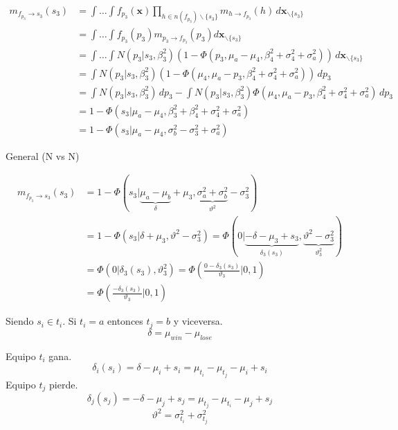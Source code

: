 \documentclass[11pt,twoside,spanish]{report} %
\begin{document}
\begin{equation}
	\begin{split}
		m_{f_{p_3} \rightarrow s_3}(s_3) & = \int \dots \int f_{p_3}(\textbf{x}) \prod_{h \in n(f_{p_3}) \backslash \{s_3\} } m_{h \rightarrow f_{p_3}}(h) \, d\textbf{x}_{\backslash \{s_3\} }  \\
		&= \int \dots \int f_{p_3}(p_3)m_{p_3 \rightarrow f_{p_3}}(p_3) d\textbf{x}_{\backslash \{s_3\} }  \\
		&= \int \dots \int N(p_3| s_3, \beta_3^2) (1 - \Phi(p_3, \mu_a  - \mu_4, \beta_4^2 + \sigma_4^2 + \sigma_a^2)) \, d\textbf{x}_{\backslash \{s_3\} }\\
		& = \int N(p_3| s_3, \beta_3^2) (1 - \Phi(\mu_4, \mu_a  - p_3, \beta_4^2 + \sigma_4^2 + \sigma_a^2)) \, dp_3 \\
		&=\int N(p_3| s_3, \beta_3^2) \, dp_3 -  \int N(p_3| s_3, \beta_3^2)  \Phi(\mu_4, \mu_a  - p_3, \beta_4^2 + \sigma_4^2 + \sigma_a^2) \, dp_3 \\
		&=1 - \Phi\left(s_3| \mu_a-  \mu_4, \beta_3^2 +\beta_4^2 + \sigma_4^2 + \sigma_a^2 \right)\\
		&=1 - \Phi\left(s_3| \mu_a-  \mu_4, \sigma_b^2-\sigma_3^2 + \sigma_a^2 \right)
	\end{split}
\end{equation}

General (N vs N)

\begin{equation}
	\begin{split}
		m_{f_{p_3} \rightarrow s_3}(s_3) & = 1 - \Phi(s_3| \underbrace{\mu_a-\mu_b}_{\delta}+\mu_3, \underbrace{\sigma_a^2 + \sigma_b^2}_{\vartheta^2} - \sigma_3^2 ) \\
		& = 1 - \Phi(s_3| \delta+\mu_3, \vartheta^2- \sigma_3^2 ) = \Phi(0| \underbrace{-\delta-\mu_3+s_3}_{\delta_3(s_3)}, \underbrace{\vartheta^2- \sigma_3^2}_{\vartheta_3^2}) \\
		& = \Phi(0|\delta_3(s_3),\vartheta_3^2)  = \Phi\left(\frac{0-\delta_3(s_3)}{\vartheta_3}|0,1\right) \\
		& = \Phi\left(\frac{-\delta_3(s_3)}{\vartheta_3}|0,1\right)
	\end{split}
\end{equation}

Siendo $s_i \in t_i$. Si $t_i = a$ entonces $t_j=b$ y viceversa.
\begin{equation}
	\delta = \mu_{win} - \mu_{lose}
\end{equation}

Equipo $t_i$ gana.
\begin{equation}
	\delta_i(s_i) = \delta -\mu_i+s_i =\mu_{t_i} - \mu_{t_j}-\mu_i+s_i
\end{equation}
Equipo $t_j$ pierde.
\begin{equation}
	\delta_j(s_j) = -\delta -\mu_j+s_j = \mu_{t_j}-\mu_{t_i}-\mu_j+s_j
\end{equation}
\begin{equation}
	\vartheta^2 = \sigma_{t_i}^2 + \sigma_{t_j}^2
\end{equation}
\end{document}
